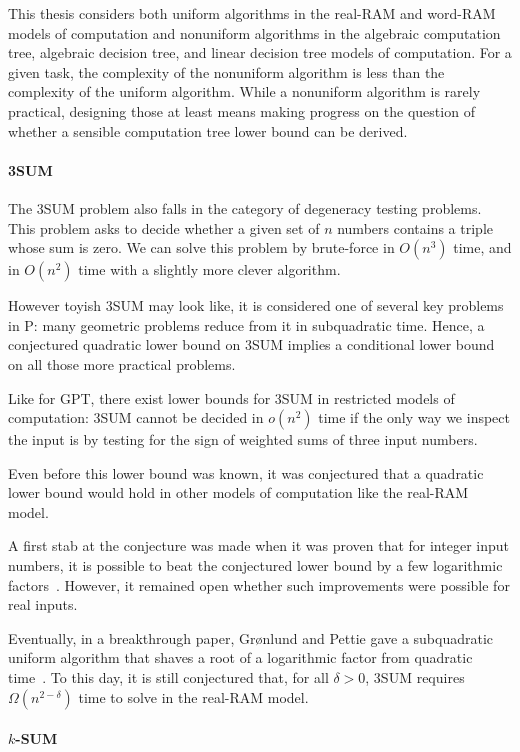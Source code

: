 This thesis considers both uniform algorithms in the real-RAM and word-RAM
models of computation and nonuniform algorithms in the algebraic computation
tree, algebraic decision tree, and linear decision tree models of computation.
For a given task, the complexity of the nonuniform algorithm is less than
the complexity of the uniform algorithm. While a nonuniform algorithm is rarely
practical, designing those at least means making progress on the question of
whether a sensible computation tree lower bound can be derived.

\paragraph{3SUM}
The 3SUM problem also falls in the category of degeneracy testing problems.
This problem asks to decide whether a given set of \(n\) numbers contains a triple
whose sum is zero. We can solve this problem by brute-force in \(O(n^3)\) time,
and in \(O(n^2)\) time with a slightly more clever algorithm.

However toyish 3SUM may look like, it is considered one of several key problems
in P: many geometric problems reduce from it in subquadratic time. Hence, a
conjectured quadratic lower bound on 3SUM implies a conditional lower bound on
all those more practical problems.

Like for GPT, there exist lower bounds for 3SUM in restricted models of
computation: 3SUM cannot be decided in \(o(n^2)\) time if the only way we
inspect the input is by testing for the sign of weighted sums of three
input numbers.

Even before this lower bound was known, it was conjectured that a quadratic lower
bound would hold in other models of computation like the real-RAM model.

A first stab at the conjecture was made when it was proven that for integer
input numbers, it is possible to beat the conjectured lower bound by a few
logarithmic factors~\cite{BDP08}.
However, it remained open whether such improvements were
possible for real inputs.

Eventually, in a breakthrough paper, Gr\o nlund and Pettie gave a subquadratic
uniform algorithm that shaves a root of a logarithmic factor from quadratic
time~\cite{GP18}.
%
To this day, it is still conjectured that, for all \(\delta > 0\), 3SUM
requires \(\Omega(n^{2 - \delta})\) time to solve in the real-RAM model.

\paragraph{\(k\)-SUM}

